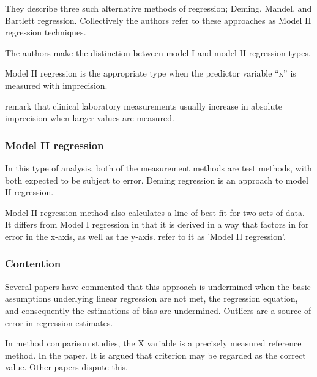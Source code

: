 \documentclass[12pt, a4paper]{report}
\theoremstyle{plain}
\theoremstyle{definition}
\theoremstyle{remark}
\begin{document}
They describe three such alternative methods of regression; Deming, Mandel, and Bartlett regression. Collectively the authors refer to these approaches as Model II regression techniques.
	
The authors make the distinction between model I and model II regression types.
	
	Model II regression is the appropriate type when the predictor variable “x” is measured with imprecision.
	
\citet{CornCoch} remark that clinical laboratory measurements usually increase in absolute imprecision when larger values are measured.
	
\subsubsection{Model II regression}
In this type of analysis, both of the measurement methods are test methods, with both expected to be subject to error. Deming regression is an approach to model II regression.
	
Model II regression method also calculates a line of best fit for two sets of data. It differs from Model I regression in that it is derived in a way that factors in for error in the x-axis, as well as the y-axis. \citet{CornCoch} refer to it as 'Model II regression'.

	

	
	
	
	
	
	\subsubsection{Contention }
	Several papers have commented that this approach is undermined
	when the basic assumptions underlying linear regression are not
	met, the regression equation, and consequently the estimations of
	bias are undermined. Outliers are a source of error in regression
	estimates.
	
	
	In method comparison studies, the X variable is a precisely measured reference method. In the \citet{CornCoch} paper. It is argued that criterion may be regarded as the correct value. Other papers dispute this.
	
	
	
	

	
	
	
	
\end{document}

